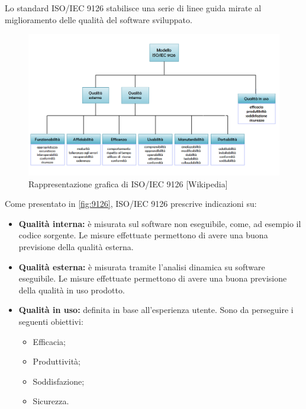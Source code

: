 Lo standard ISO/IEC 9126 stabilisce una serie di linee guida mirate al miglioramento delle qualità del software sviluppato.

\begin{figure}[H]
  \includegraphics[width=\linewidth]{sez/App_Qualita/grafico_9126.png}
  \caption{Rappresentazione grafica di ISO/IEC 9126 [Wikipedia]}
  \label{fig:9126}
\end{figure}

Come presentato in \autoref{fig:9126}, ISO/IEC 9126 prescrive indicazioni su:
\begin{itemize}
	\item \textbf{Qualità interna: }è misurata sul software non eseguibile, come, ad esempio il codice sorgente. Le misure effettuate permettono di avere una buona previsione della qualità esterna.
	\item \textbf{Qualità esterna: }è misurata tramite l'analisi dinamica su software eseguibile. Le misure effettuate permettono di avere una buona previsione della qualità in uso prodotto.
	\item \textbf{Qualità in uso: }definita in base all'esperienza utente. Sono da perseguire i seguenti obiettivi:
		\begin{itemize}
			\item Efficacia;
			\item Produttività;
			\item Soddisfazione;
			\item Sicurezza.
		\end{itemize}
\end{itemize}

